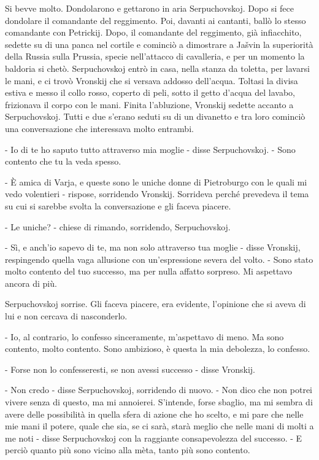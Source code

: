 Si bevve molto. Dondolarono e gettarono in aria Serpuchovskoj. Dopo si fece dondolare il comandante del reggimento. Poi, davanti ai cantanti, ballò lo stesso comandante con Petrickij. Dopo, il comandante del reggimento, già infiacchito, sedette su di una panca nel cortile e cominciò a dimostrare a Jašvin la superiorità della Russia sulla Prussia, specie nell'attacco di cavalleria, e per un momento la baldoria si chetò. Serpuchovskoj entrò in casa, nella stanza da toletta, per lavarsi le mani, e ci trovò Vronskij che si versava addosso dell'acqua. Toltasi la divisa estiva e messo il collo rosso, coperto di peli, sotto il getto d'acqua del lavabo, frizionava il corpo con le mani. Finita l'abluzione, Vronskij sedette accanto a Serpuchovskoj. Tutti e due s'erano seduti su di un divanetto e tra loro cominciò una conversazione che interessava molto entrambi. 

- Io di te ho saputo tutto attraverso mia moglie - disse Serpuchovskoj. - Sono contento che tu la veda spesso. 

- È amica di Varja, e queste sono le uniche donne di Pietroburgo con le quali mi vedo volentieri - rispose, sorridendo Vronskij. Sorrideva perché prevedeva il tema su cui si sarebbe svolta la conversazione e gli faceva piacere. 

- Le uniche? - chiese di rimando, sorridendo, Serpuchovskoj. 

- Sì, e anch'io sapevo di te, ma non solo attraverso tua moglie - disse Vronskij, respingendo quella vaga allusione con un'espressione severa del volto. - Sono stato molto contento del tuo successo, ma per nulla affatto sorpreso. Mi aspettavo ancora di più. 

Serpuchovskoj sorrise. Gli faceva piacere, era evidente, l'opinione che si aveva di lui e non cercava di nasconderlo. 

- Io, al contrario, lo confesso sinceramente, m'aspettavo di meno. Ma sono contento, molto contento. Sono ambizioso, è questa la mia debolezza, lo confesso. 

- Forse non lo confesseresti, se non avessi successo - disse Vronskij. 

- Non credo - disse Serpuchovskoj, sorridendo di nuovo. - Non dico che non potrei vivere senza di questo, ma mi annoierei. S'intende, forse sbaglio, ma mi sembra di avere delle possibilità in quella sfera di azione che ho scelto, e mi pare che nelle mie mani il potere, quale che sia, se ci sarà, starà meglio che nelle mani di molti a me noti - disse Serpuchovskoj con la raggiante consapevolezza del successo. - E perciò quanto più sono vicino alla mèta, tanto più sono contento. 

